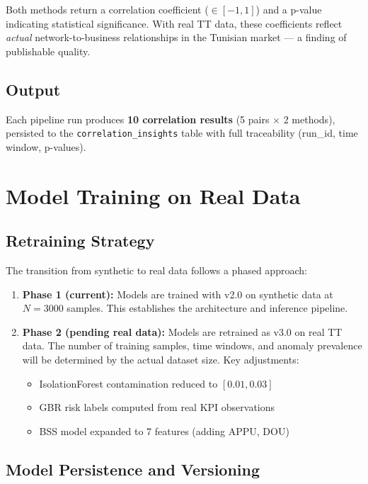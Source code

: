 Both methods return a correlation coefficient ($\in [-1, 1]$) and a p-value indicating statistical significance. With real TT data, these coefficients reflect \emph{actual} network-to-business relationships in the Tunisian market --- a finding of publishable quality.

\subsection{Output}

Each pipeline run produces \textbf{10 correlation results} (5 pairs $\times$ 2 methods), persisted to the \texttt{correlation\_insights} table with full traceability (run\_id, time window, p-values).

\section{Model Training on Real Data}

\subsection{Retraining Strategy}

The transition from synthetic to real data follows a phased approach:

\begin{enumerate}
  \item \textbf{Phase 1 (current):} Models are trained with v2.0 on synthetic data at $N = 3000$ samples. This establishes the architecture and inference pipeline.
  \item \textbf{Phase 2 (pending real data):} Models are retrained as v3.0 on real TT data. The number of training samples, time windows, and anomaly prevalence will be determined by the actual dataset size. Key adjustments:
  \begin{itemize}
    \item IsolationForest contamination reduced to $[0.01, 0.03]$
    \item GBR risk labels computed from real KPI observations
    \item BSS model expanded to 7 features (adding APPU, DOU)
  \end{itemize}
\end{enumerate}

\subsection{Model Persistence and Versioning}


